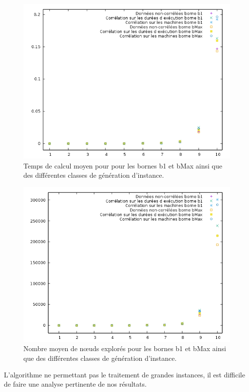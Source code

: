 \documentclass[12pt]{article}
\begin{document}
\begin{figure}[!ht]
\centering
\centerline{\includegraphics[scale=0.9]{tempsmoyen.png}}
\caption{Temps de calcul moyen pour pour les bornes b1 et bMax ainsi que des différentes classes de génération d'instance.}
\label{tmpmoy}
\end{figure}

\begin{figure}[!ht]
\centering
\centerline{\includegraphics[scale=0.9]{nodemoyen.png}}
\caption{Nombre moyen de nœuds explorés pour les bornes b1 et bMax ainsi que des différentes classes de génération d'instance.}
\label{ndmoy}
\end{figure}

L'algorithme ne permettant pas le traitement de grandes instances, il est difficile de faire une analyse pertinente de nos résultats.
\end{document}
